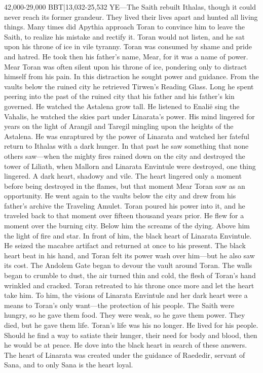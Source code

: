\documentclass[smalldemyvopaper,11pt,twoside,onecolumn,openright,extrafontsizes]{memoir}
\begin{document}
42,000-29,000 BBT|13,032-25,532 YE—The Saith rebuilt Ithalas, though it could never reach its former grandeur. They lived their lives apart and hunted all living things. Many times did Apythia approach Toran to convince him to leave the Saith, to realize his mistake and rectify it. Toran would not listen, and he sat upon his throne of ice in vile tyranny. Toran was consumed by shame and pride and hatred. He took then his father’s name, Mear, for it was a name of power. Mear Toran was often silent upon his throne of ice, pondering only to distract himself from his pain. In this distraction he sought power and guidance. From the vaults below the ruined city he retrieved Tirwen’s Reading Glass. Long he spent peering into the past of the ruined city that his father and his father’s kin governed. He watched the Astalena grow tall. He listened to Enalië sing the Vahalis, he watched the skies part under Linarata’s power. His mind lingered for years on the light of Arangil and Taregil mingling upon the heights of the Astalena. He was enraptured by the power of Linarata and watched her fateful return to Ithalas with a dark hunger. In that past he saw something that none others saw—when the mighty fires rained down on the city and destroyed the tower of Liliath, when Mallorn and Linarata Envintule were destroyed, one thing lingered. A dark heart, shadowy and vile. The heart lingered only a moment before being destroyed in the flames, but that moment Mear Toran saw as an opportunity. He went again to the vaults below the city and drew from his father’s archive the Traveling Amulet. Toran poured his power into it, and he traveled back to that moment over fifteen thousand years prior. He flew for a moment over the burning city. Below him the screams of the dying. Above him the light of fire and star. In front of him, the black heart of Linarata Envintule. He seized the macabre artifact and returned at once to his present. The black heart beat in his hand, and Toran felt its power wash over him—but he also saw its cost. The Andolem Gate began to devour the vault around Toran. The walls began to crumble to dust, the air turned thin and cold, the flesh of Toran’s hand wrinkled and cracked. Toran retreated to his throne once more and let the heart take him. To him, the visions of Linarata Envintule and her dark heart were a means to Toran’s only want—the protection of his people. The Saith were hungry, so he gave them food. They were weak, so he gave them power. They died, but he gave them life. Toran’s life was his no longer. He lived for his people. Should he find a way to satiate their hunger, their need for body and blood, then he would be at peace. He dove into the black heart in search of these answers.
	The heart of Linarata was created under the guidance of Raededir, servant of Sana, and to only Sana is the heart loyal. 
\end{document}
